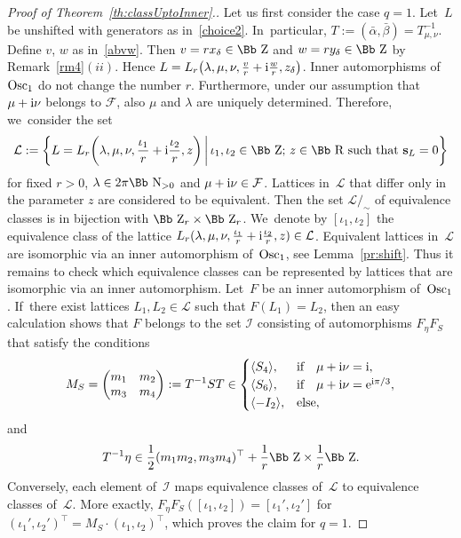 \documentclass[pdftex]{sigma}
\newcommand\RR{{\mbox{\Bb R}}}
\newcommand\NN{{\mbox{\Bb N}}}
\newcommand\ZZ{{\mbox{\Bb Z}}}
\newcommand\bs{\textbf{{\rm \textbf{s}}}}
\newcommand\cF{{\mathcal F}}
\newcommand{\Osc}{{\rm Osc}}
\newcommand\la{\langle}
\newcommand\ra{\rangle}
\numberwithin{equation}{section}
\begin{document}
\begin{proof}[Proof of Theorem~\ref{th:classUptoInner}.]
Let us first consider the case $q=1$. Let~$L$ be unshifted with generators as in~\eqref{choice2}. In~particular, $T:=(\bar \alpha,\bar\beta)=T_{\mu,\nu}^{-1}$. Define $v$, $w$ as in~\eqref{abvw}. Then $v=rx_\delta\in\ZZ$ and $w=ry_\delta\in\ZZ$ by Remark~\ref{rm4}$(ii)$. Hence $L=L_r\big(\lambda,\mu,\nu,\frac vr+{\rm i}\frac wr,z_\delta\big)$. Inner automorphisms of~$\Osc_1$ do not change the number $r$. Furthermore, under our assumption that $\mu+{\rm i}\nu$ belongs to $\cF$, also $\mu$ and $\lambda$ are uniquely determined. Therefore, we~consider the set
\begin{gather*}
{\mathcal L}:=\bigg\{L=L_r\bigg(\lambda,\mu,\nu,\frac {\iota_1}r+{\rm i}\frac {\iota_2}r,z\bigg)\,\bigg|\, \iota_1,\iota_2\in\ZZ;\, z\in\RR \text{ such that } \bs_L=0\bigg\}
\end{gather*}
for fixed $r>0$, $\lambda\in 2\pi\NN_{>0}$ and $\mu+{\rm i}\nu\in\cF$. Lattices in~$\mathcal L$ that differ only in the parameter $z$ are considered to be equivalent. Then the set ${\mathcal L}/_{\sim}$ of equivalence classes is in bijection with $\ZZ_r\times\ZZ_r$. We~denote by $[\iota_1,\iota_2]$ the equivalence class of the lattice $L_r(\lambda,\mu,\nu,\frac {\iota_1}r+{\rm i}\frac {\iota_2}r,z)\in {\mathcal L}$. Equivalent lattices in~${\mathcal L}$ are isomorphic via an inner automorphism of~$\Osc_1$, see Lemma~\ref{pr:shift}. Thus it remains to check which equivalence classes can be represented by lattices that are isomorphic via an inner automorphism. Let~$F$ be an inner automorphism of~$\Osc_1$. If~there exist lattices $L_1,L_2\in{\mathcal L}$ such that $F(L_1)=L_2$, then an easy calculation shows that $F$ belongs to the set
${\mathcal I}$ consisting of automorphisms $F_\eta F_S$ that satisfy the conditions
\begin{gather*}
M_S= \begin{pmatrix}m_1&m_2\\m_3&m_4\end{pmatrix}:=T^{-1}ST\in
\begin{cases}
\la S_4 \ra, & \text{if}\quad\mu+{\rm i}\nu={\rm i},\\
\la S_6 \ra, & \text{if}\quad \mu+{\rm i}\nu={\rm e}^{{\rm i}\pi/3},\\
\la -I_2 \ra, & \text{else},
\end{cases}
\end{gather*}
and
\begin{gather*}
T^{-1} \eta\in {\frac12} (m_1 m_2, m_3 m_4)^\top + \frac1r\ZZ\times\frac1r \ZZ.
\end{gather*}
Conversely, each element of~${\mathcal I}$ maps equivalence classes of~${\mathcal L}$ to equivalence classes of~${\mathcal L}$. More exactly, $F_\eta F_S([\iota_1,\iota_2])= [\iota_1',\iota_2']$ for $(\iota_1',\iota_2')^\top= M_S\cdot (\iota_1,\iota_2)^\top$, which proves the claim for $q=1$.


\end{proof}
\end{document}

